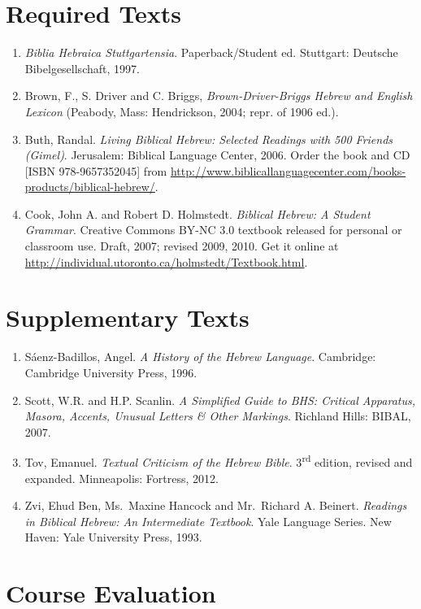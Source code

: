 \documentclass[12pt]{article}
\begin{document}
\section{Required Texts}

\begin{enumerate}[1.]
\item
  \emph{Biblia Hebraica Stuttgartensia}. Paperback/Student ed.
  Stuttgart: Deutsche Bibelgesellschaft, 1997.
\item
  Brown, F., S. Driver and C. Briggs, \emph{Brown-Driver-Briggs Hebrew
  and English Lexicon} (Peabody, Mass: Hendrickson, 2004; repr. of 1906
  ed.).
\item
  Buth, Randal. \emph{Living Biblical Hebrew: Selected Readings with 500
  Friends (Gimel)}. Jerusalem: Biblical Language Center, 2006. Order the
  book and CD {[}ISBN 978-9657352045{]} from
  \url{http://www.biblicallanguagecenter.com/books-products/biblical-hebrew/}.
\item
  Cook, John A. and Robert D. Holmstedt. \emph{Biblical Hebrew: A
  Student Grammar}. Creative Commons BY-NC 3.0 textbook released for
  personal or classroom use. Draft, 2007; revised 2009, 2010. Get it
  online at \url{http://individual.utoronto.ca/holmstedt/Textbook.html}.
\end{enumerate}

\section{Supplementary Texts}

\begin{enumerate}[1.]
\item
  Sáenz-Badillos, Angel. \emph{A History of the Hebrew Language}.
  Cambridge: Cambridge University Press, 1996.
\item
  Scott, W.R. and H.P. Scanlin. \emph{A Simplified Guide to
  BHS: Critical Apparatus, Masora, Accents, Unusual Letters \& Other
  Markings}. Richland Hills:
  BIBAL, 2007.
\item
  Tov, Emanuel. \emph{Textual Criticism of the Hebrew Bible}.
  3\textsuperscript{rd} edition, revised and expanded. Minneapolis:
  Fortress, 2012.
\item
  Zvi, Ehud Ben, Ms.~Maxine Hancock and Mr.~Richard A. Beinert.
  \emph{Readings in Biblical Hebrew: An Intermediate Textbook}. Yale
  Language Series. New Haven: Yale University Press, 1993.
\end{enumerate}

\section{Course Evaluation}
\end{document}
